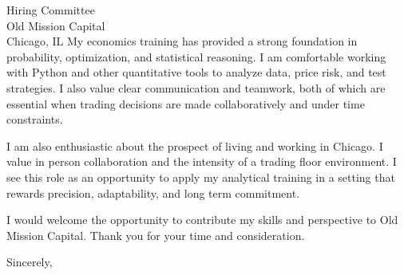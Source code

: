 \documentclass[11pt]{letter}
\begin{document}
\begin{letter}{Hiring Committee \\ Old Mission Capital \\ Chicago, IL}
My economics training has provided a strong foundation in probability, optimization, and statistical reasoning. I am comfortable working with Python and other quantitative tools to analyze data, price risk, and test strategies. I also value clear communication and teamwork, both of which are essential when trading decisions are made collaboratively and under time constraints.

I am also enthusiastic about the prospect of living and working in Chicago. I value in person collaboration and the intensity of a trading floor environment. I see this role as an opportunity to apply my analytical training in a setting that rewards precision, adaptability, and long term commitment.

I would welcome the opportunity to contribute my skills and perspective to Old Mission Capital. Thank you for your time and consideration.

\closing{Sincerely,}

\end{letter}
\end{document}
